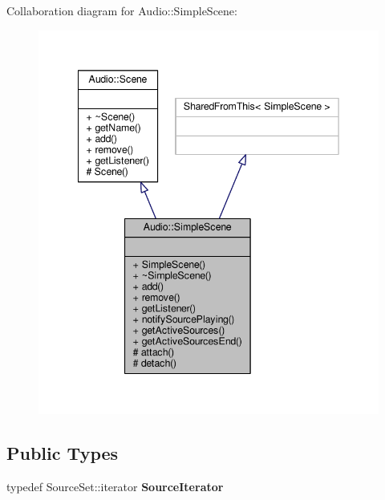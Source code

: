 Collaboration diagram for Audio\+:\+:Simple\+Scene\+:
\nopagebreak
\begin{figure}[H]
\begin{center}
\leavevmode
\includegraphics[width=342pt]{d3/d7d/classAudio_1_1SimpleScene__coll__graph}
\end{center}
\end{figure}
\subsection*{Public Types}
\begin{DoxyCompactItemize}
\item 
typedef Source\+Set\+::iterator {\bfseries Source\+Iterator}\hypertarget{classAudio_1_1SimpleScene_afd7ebe86e5629e69eb0789a2832a66ba}{}\label{classAudio_1_1SimpleScene_afd7ebe86e5629e69eb0789a2832a66ba}

\end{DoxyCompactItemize}
